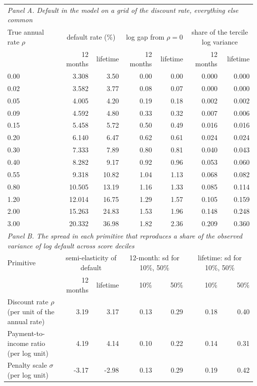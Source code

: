 \begin{tabular}{lrrrrrr}
\toprule
\multicolumn{7}{l}{\emph{Panel A. Default in the model on a grid of the discount rate, everything else common}} \\
True annual rate $\rho$ & \multicolumn{2}{c}{default rate (\%)} & \multicolumn{2}{c}{log gap from $\rho = 0$} & \multicolumn{2}{c}{share of the tercile log variance} \\
 & 12 months & lifetime & 12 months & lifetime & 12 months & lifetime \\
\midrule
0.00 & 3.308 & 3.50 & 0.00 & 0.00 & 0.000 & 0.000 \\
0.02 & 3.582 & 3.77 & 0.08 & 0.07 & 0.000 & 0.000 \\
0.05 & 4.005 & 4.20 & 0.19 & 0.18 & 0.002 & 0.002 \\
0.09 & 4.592 & 4.80 & 0.33 & 0.32 & 0.007 & 0.006 \\
0.15 & 5.458 & 5.72 & 0.50 & 0.49 & 0.016 & 0.016 \\
0.20 & 6.140 & 6.47 & 0.62 & 0.61 & 0.024 & 0.024 \\
0.30 & 7.333 & 7.89 & 0.80 & 0.81 & 0.040 & 0.043 \\
0.40 & 8.282 & 9.17 & 0.92 & 0.96 & 0.053 & 0.060 \\
0.55 & 9.318 & 10.82 & 1.04 & 1.13 & 0.068 & 0.082 \\
0.80 & 10.505 & 13.19 & 1.16 & 1.33 & 0.085 & 0.114 \\
1.20 & 12.014 & 16.75 & 1.29 & 1.57 & 0.105 & 0.159 \\
2.00 & 15.263 & 24.83 & 1.53 & 1.96 & 0.148 & 0.248 \\
3.00 & 20.332 & 36.98 & 1.82 & 2.36 & 0.209 & 0.360 \\
\midrule
\multicolumn{7}{l}{\emph{Panel B. The spread in each primitive that reproduces a share of the observed variance of log default across score deciles}} \\
Primitive & \multicolumn{2}{c}{semi-elasticity of default} & \multicolumn{2}{c}{12-month: sd for 10\%, 50\%} & \multicolumn{2}{c}{lifetime: sd for 10\%, 50\%} \\
 & 12 months & lifetime & 10\% & 50\% & 10\% & 50\% \\
\midrule
Discount rate $\rho$ (per unit of the annual rate) & 3.19 & 3.17 & 0.13 & 0.29 & 0.18 & 0.40 \\
Payment-to-income ratio (per log unit) & 4.19 & 4.14 & 0.10 & 0.22 & 0.14 & 0.31 \\
Penalty scale $\sigma$ (per log unit) & -3.17 & -2.98 & 0.13 & 0.29 & 0.19 & 0.42 \\

\end{tabular}
